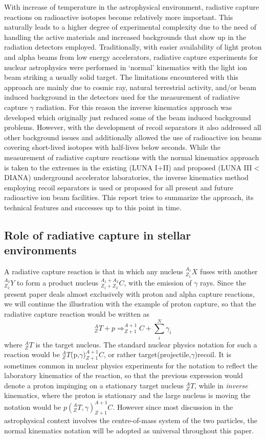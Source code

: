 With increase of temperature in the astrophysical environment, radiative capture reactions on radioactive isotopes become relatively more important. This naturally leads to a higher degree of experimental complexity due to the need of handling the active materials and increased backgrounds that show up in the radiation detectors employed. Traditionally, with easier availability of light proton and alpha beams from low energy accelerators, radiative capture experiments for nuclear astrophysics were performed in `normal' kinematics with the light ion beam striking a usually solid target. The limitations encountered with this approach are mainly due to cosmic ray, natural terrestrial activity, and/or beam induced background in the detectors used for the measurement of radiative capture $\gamma$ radiation. For this reason the inverse kinematics approach was developed which originally just reduced some of the beam induced background problems. However, with the development of recoil separators it also addressed all other background issues and additionally allowed the use of radioactive ion beams covering short-lived isotopes with half-lives below seconds. While the measurement of radiative capture reactions with the normal kinematics approach is taken to the extremes in the existing (LUNA I+II) and proposed (LUNA III$<$ DIANA) underground accelerator laboratories, the inverse kinematics method employing recoil separators is used or proposed for all present and future radioactive ion beam facilities. This report tries to summarize the approach, its technical features and successes up to this point in time.


\subsection{Role of radiative capture in stellar environments}

A radiative capture reaction is that in which any nucleus $^{A_{1}}_{Z_{1}}X$ fuses with another $^{A_{2}}_{Z_{2}}Y$ to form a product nucleus $^{A_{1}+A_{2}}_{Z_{1}+Z_{2}}C$, with the emission of $\gamma$ rays. Since the present paper deals almost exclusively with proton and alpha capture reactions, we will continue the illustration with the example of proton capture, so that the radiative capture reaction would be written as
\begin{equation}
^{A}_{Z}T+p\Rightarrow^{A+1}_{Z+1}C+\sum_{i}^{N}{\gamma_{i}}
\end{equation}
where $^{A}_{Z}T$ is the target nucleus. The standard nuclear physics notation for such a reaction would be $^{A}_{Z}T$(p,$\gamma$)$^{A+1}_{Z+1}C$, or rather target(projectile,$\gamma$)recoil. It is sometimes common in nuclear physics experiments for the notation to reflect the laboratory kinematics of the reaction, so that the previous expression would denote a proton impinging on a stationary target nucleus $^{A}_{Z}T$, while in {\it inverse} kinematics, where the proton is stationary and the large nucleus is moving the notation would be $p(^{A}_{Z}T,\gamma)^{A+1}_{Z+1}C$. However since most discussion in the astrophysical context involves the centre-of-mass system of the two particles, the normal kinematics notation will be adopted as universal throughout this paper. 

